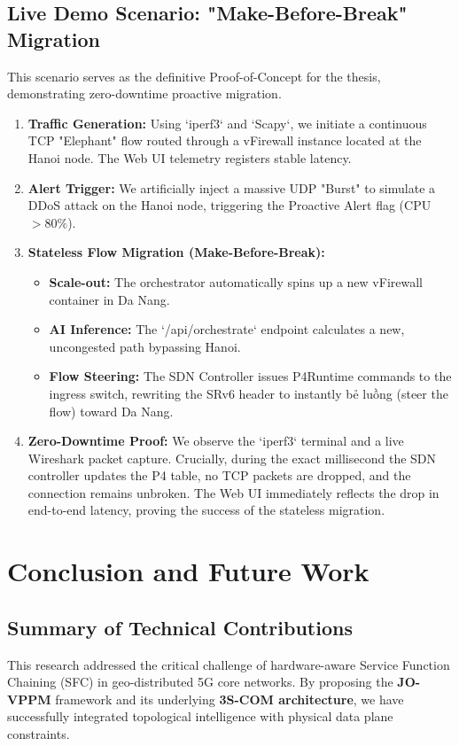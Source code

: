 \section{Live Demo Scenario: "Make-Before-Break" Migration}
This scenario serves as the definitive Proof-of-Concept for the thesis, demonstrating zero-downtime proactive migration.
\begin{enumerate}
    \item \textbf{Traffic Generation:} Using `iperf3` and `Scapy`, we initiate a continuous TCP "Elephant" flow routed through a vFirewall instance located at the Hanoi node. The Web UI telemetry registers stable latency.
    \item \textbf{Alert Trigger:} We artificially inject a massive UDP "Burst" to simulate a DDoS attack on the Hanoi node, triggering the Proactive Alert flag (CPU $> 80\%$).
    \item \textbf{Stateless Flow Migration (Make-Before-Break):}
    \begin{itemize}
        \item \textbf{Scale-out:} The orchestrator automatically spins up a new vFirewall container in Da Nang.
        \item \textbf{AI Inference:} The `/api/orchestrate` endpoint calculates a new, uncongested path bypassing Hanoi.
        \item \textbf{Flow Steering:} The SDN Controller issues P4Runtime commands to the ingress switch, rewriting the SRv6 header to instantly bẻ luồng (steer the flow) toward Da Nang.
    \end{itemize}
    \item \textbf{Zero-Downtime Proof:} We observe the `iperf3` terminal and a live Wireshark packet capture. Crucially, during the exact millisecond the SDN controller updates the P4 table, no TCP packets are dropped, and the connection remains unbroken. The Web UI immediately reflects the drop in end-to-end latency, proving the success of the stateless migration.
\end{enumerate}


\chapter{Conclusion and Future Work}
\label{chap:conclusions}

\section{Summary of Technical Contributions}
This research addressed the critical challenge of hardware-aware Service Function Chaining (SFC) in geo-distributed 5G core networks. By proposing the \textbf{JO-VPPM} framework and its underlying \textbf{3S-COM architecture}, we have successfully integrated topological intelligence with physical data plane constraints. 

